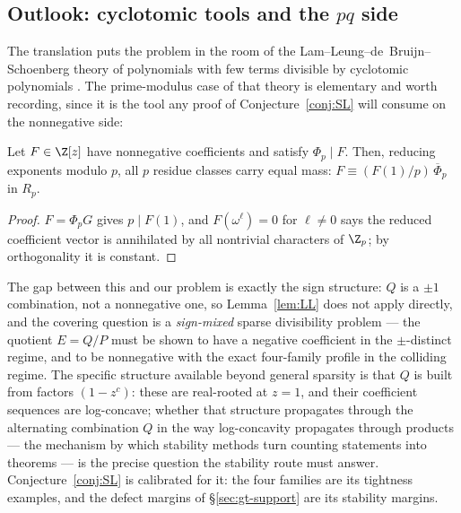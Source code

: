 \subsection{Outlook: cyclotomic tools and the $pq$ side}\label{sec:gt-outlook}

The translation puts the problem in the room of the
Lam--Leung--de~Bruijn--Schoenberg theory of polynomials with few terms
divisible by cyclotomic polynomials
\cite{deBruijnSchoenberg,LamLeung}. The prime-modulus case of that theory is
elementary and worth recording, since it is the tool any proof of
Conjecture~\ref{conj:SL} will consume on the nonnegative side:

\begin{lemma}\label{lem:LL}
Let $F\in\Z[z]$ have nonnegative coefficients and satisfy $\Phi_p\mid F$.
Then, reducing exponents modulo $p$, all $p$ residue classes carry equal
mass: $F\equiv(F(1)/p)\,\overline\Phi_p$ in $R_p$.
\end{lemma}

\begin{proof}
$F=\Phi_pG$ gives $p\mid F(1)$, and $F(\omega^\ell)=0$ for $\ell\ne0$ says
the reduced coefficient vector is annihilated by all nontrivial characters
of $\Z_p$; by orthogonality it is constant.
\end{proof}

The gap between this and our problem is exactly the sign structure: $Q$ is
a $\pm1$ combination, not a nonnegative one, so Lemma~\ref{lem:LL} does not
apply directly, and the covering question is a \emph{sign-mixed} sparse
divisibility problem --- the quotient $E=Q/P$ must be shown to have a
negative coefficient in the $\pm$-distinct regime, and to be nonnegative
with the exact four-family profile in the colliding regime. The specific
structure available beyond general sparsity is that $Q$ is built from
factors $(1-z^{c})$: these are real-rooted at $z=1$, and their coefficient
sequences are log-concave; whether that structure propagates through the
alternating combination $Q$ in the way log-concavity propagates through
products --- the mechanism by which stability methods turn counting
statements into theorems \cite{BrandenHuh} --- is the precise question the
stability route must answer. Conjecture~\ref{conj:SL} is calibrated for it:
the four families are its tightness examples, and the defect margins of
\S\ref{sec:gt-support} are its stability margins.

